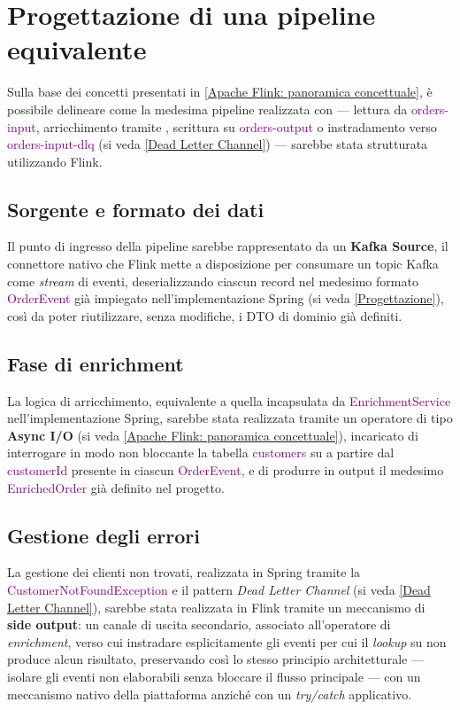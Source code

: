 \section{Progettazione di una pipeline equivalente}
\label{Progettazione di una pipeline equivalente}
Sulla base dei concetti presentati in \ref{Apache Flink: panoramica concettuale}, è possibile delineare come la medesima pipeline realizzata con  — lettura da \textcolor{purple}{orders-input}, arricchimento tramite , scrittura su \textcolor{purple}{orders-output} o instradamento verso \textcolor{purple}{orders-input-dlq} (si veda \ref{Dead Letter Channel}) — sarebbe stata strutturata utilizzando Flink.

\subsection{Sorgente e formato dei dati}
Il punto di ingresso della pipeline sarebbe rappresentato da un \textbf{Kafka Source}, il connettore nativo che Flink mette a disposizione per consumare un topic Kafka come \textit{stream} di eventi, deserializzando ciascun record nel medesimo formato \textcolor{purple}{OrderEvent} già impiegato nell'implementazione Spring (si veda \ref{Progettazione}), così da poter riutilizzare, senza modifiche, i \acrshort{DTO} di dominio già definiti.

\subsection{Fase di enrichment}
La logica di arricchimento, equivalente a quella incapsulata da \textcolor{purple}{EnrichmentService} nell'implementazione Spring, sarebbe stata realizzata tramite un operatore di tipo \textbf{Async I/O} (si veda \ref{Apache Flink: panoramica concettuale}), incaricato di interrogare in modo non bloccante la tabella \textcolor{purple}{customers} su  a partire dal \textcolor{purple}{customerId} presente in ciascun \textcolor{purple}{OrderEvent}, e di produrre in output il medesimo \textcolor{purple}{EnrichedOrder} già definito nel progetto.

\subsection{Gestione degli errori}
La gestione dei clienti non trovati, realizzata in Spring tramite la \textcolor{purple}{CustomerNotFoundException} e il pattern \textit{Dead Letter Channel} (si veda \ref{Dead Letter Channel}), sarebbe stata realizzata in Flink tramite un meccanismo di \textbf{side output}: un canale di uscita secondario, associato all'operatore di \textit{enrichment}, verso cui instradare esplicitamente gli eventi per cui il \textit{lookup} su  non produce alcun risultato, preservando così lo stesso principio architetturale — isolare gli eventi non elaborabili senza bloccare il flusso principale — con un meccanismo nativo della piattaforma anziché con un \textit{try/catch} applicativo.

